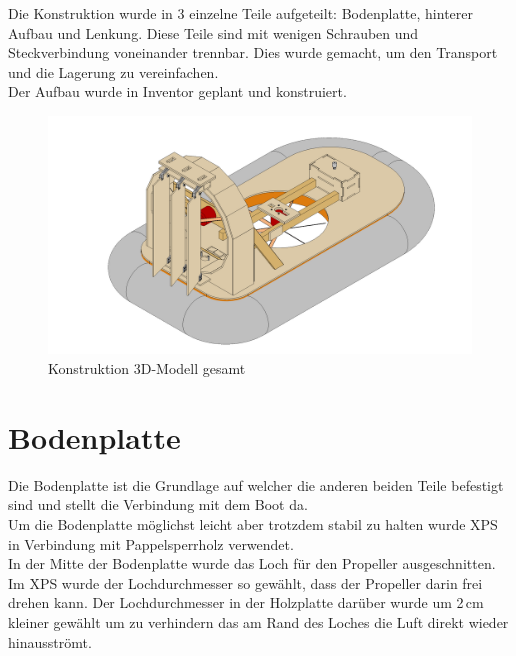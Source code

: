Die Konstruktion wurde in 3 einzelne Teile aufgeteilt: Bodenplatte, hinterer Aufbau und Lenkung. Diese Teile sind mit wenigen Schrauben und Steckverbindung voneinander trennbar. Dies wurde gemacht, um den Transport und die Lagerung zu vereinfachen.\\
Der Aufbau wurde in Inventor geplant und konstruiert.\\
\begin{figure}[H]
    \centering
    \includegraphics[width=\textwidth]{../Inventor/Luftkissenboot.png}
    \caption{Konstruktion 3D-Modell gesamt}
\end{figure}

\clearpage
\section{Bodenplatte}
Die Bodenplatte ist die Grundlage auf welcher die anderen beiden Teile befestigt sind und stellt die Verbindung mit dem Boot da.\\
Um die Bodenplatte möglichst leicht aber trotzdem stabil zu halten wurde XPS in Verbindung mit Pappelsperrholz verwendet.\\
In der Mitte der Bodenplatte wurde das Loch für den Propeller ausgeschnitten. Im XPS wurde der Lochdurchmesser so gewählt, dass der Propeller darin frei drehen kann. Der Lochdurchmesser in der Holzplatte darüber wurde um 2\,cm kleiner gewählt um zu verhindern das am Rand des Loches die Luft direkt wieder hinausströmt.


